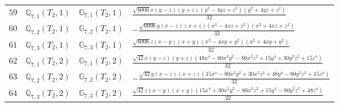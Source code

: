 \documentclass[fleqn,8pt,landscape]{jsarticle}
\begin{document}
\begin{table}[ht!]
\begin{center}
\begin{tabular}{cccl}
$ 59 $ & $ \mathbb{Q}_{7,1}(T_{2},1) $ & $ \mathbb{G}_{7,1}(T_{2},1) $ & $ \frac{\sqrt{6006} x \left(y - z\right) \left(y + z\right) \left(y^{2} - 4 y z + z^{2}\right) \left(y^{2} + 4 y z + z^{2}\right)}{32} $ \\
$ 60 $ & $ \mathbb{Q}_{7,2}(T_{2},1) $ & $ \mathbb{G}_{7,2}(T_{2},1) $ & $ - \frac{\sqrt{6006} y \left(x - z\right) \left(x + z\right) \left(x^{2} - 4 x z + z^{2}\right) \left(x^{2} + 4 x z + z^{2}\right)}{32} $ \\
$ 61 $ & $ \mathbb{Q}_{7,3}(T_{2},1) $ & $ \mathbb{G}_{7,3}(T_{2},1) $ & $ \frac{\sqrt{6006} z \left(x - y\right) \left(x + y\right) \left(x^{2} - 4 x y + y^{2}\right) \left(x^{2} + 4 x y + y^{2}\right)}{32} $ \\
$ 62 $ & $ \mathbb{Q}_{7,1}(T_{2},2) $ & $ \mathbb{G}_{7,1}(T_{2},2) $ & $ \frac{\sqrt{42} x \left(y - z\right) \left(y + z\right) \left(48 x^{4} - 80 x^{2} y^{2} - 80 x^{2} z^{2} + 15 y^{4} + 30 y^{2} z^{2} + 15 z^{4}\right)}{32} $ \\
$ 63 $ & $ \mathbb{Q}_{7,2}(T_{2},2) $ & $ \mathbb{G}_{7,2}(T_{2},2) $ & $ - \frac{\sqrt{42} y \left(x - z\right) \left(x + z\right) \left(15 x^{4} - 80 x^{2} y^{2} + 30 x^{2} z^{2} + 48 y^{4} - 80 y^{2} z^{2} + 15 z^{4}\right)}{32} $ \\
$ 64 $ & $ \mathbb{Q}_{7,3}(T_{2},2) $ & $ \mathbb{G}_{7,3}(T_{2},2) $ & $ \frac{\sqrt{42} z \left(x - y\right) \left(x + y\right) \left(15 x^{4} + 30 x^{2} y^{2} - 80 x^{2} z^{2} + 15 y^{4} - 80 y^{2} z^{2} + 48 z^{4}\right)}{32} $ \\
 \hline \hline
\end{tabular}
\end{center}
\end{table}
\end{document}
